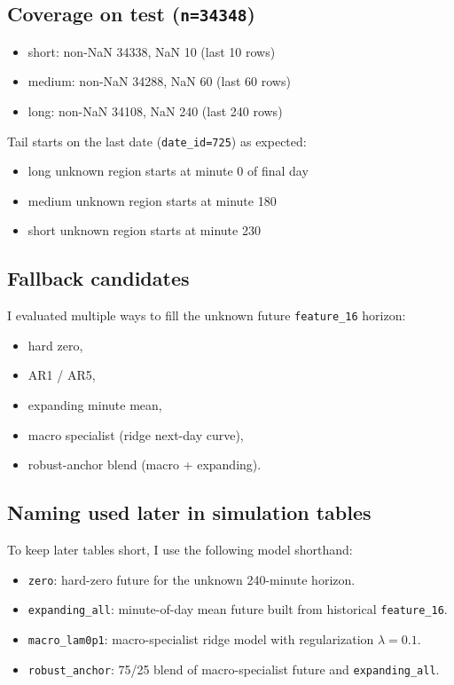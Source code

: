 \subsection{Coverage on test (\texttt{n=34348})}
\begin{itemize}[leftmargin=1.5em]
  \item short: non-NaN 34338, NaN 10 (last 10 rows)
  \item medium: non-NaN 34288, NaN 60 (last 60 rows)
  \item long: non-NaN 34108, NaN 240 (last 240 rows)
\end{itemize}

Tail starts on the last date (\texttt{date\_id=725}) as expected:
\begin{itemize}[leftmargin=1.5em]
  \item long unknown region starts at minute 0 of final day
  \item medium unknown region starts at minute 180
  \item short unknown region starts at minute 230
\end{itemize}

\subsection{Fallback candidates}
I evaluated multiple ways to fill the unknown future \texttt{feature\_16} horizon:
\begin{itemize}[leftmargin=1.5em]
  \item hard zero,
  \item AR1 / AR5,
  \item expanding minute mean,
  \item macro specialist (ridge next-day curve),
  \item robust-anchor blend (macro + expanding).
\end{itemize}

\subsection{Naming used later in simulation tables}
To keep later tables short, I use the following model shorthand:
\begin{itemize}[leftmargin=1.5em]
  \item \texttt{zero}: hard-zero future for the unknown 240-minute horizon.
  \item \texttt{expanding\_all}: minute-of-day mean future built from historical \texttt{feature\_16}.
  \item \texttt{macro\_lam0p1}: macro-specialist ridge model with regularization $\lambda=0.1$.
  \item \texttt{robust\_anchor}: 75/25 blend of macro-specialist future and \texttt{expanding\_all}.
\end{itemize}

